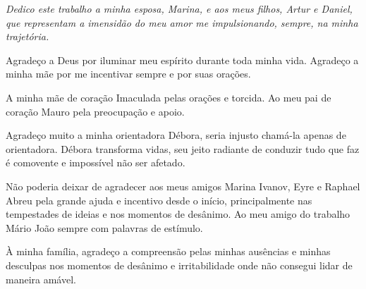 \begin{flushright}
{\em 
Dedico este trabalho a minha esposa, Marina, e aos meus filhos, Artur e Daniel, que representam a imensidão do meu amor me impulsionando, sempre, na minha trajetória.
}
\end{flushright}
\newpage


\hspace{5mm}

Agradeço a Deus por iluminar meu espírito durante toda minha vida. Agradeço a minha mãe por me incentivar sempre e por suas orações. 

A minha mãe de coração Imaculada pelas orações e torcida. Ao meu pai de coração Mauro pela preocupação e apoio.

Agradeço muito a minha orientadora Débora, seria injusto chamá-la apenas de orientadora. Débora transforma vidas, seu jeito radiante de conduzir tudo que faz é comovente e impossível não ser afetado.

Não poderia deixar de agradecer aos meus amigos Marina Ivanov,  Eyre e Raphael Abreu pela grande ajuda e incentivo desde o início, principalmente nas tempestades de ideias e nos momentos de desânimo. Ao meu amigo do trabalho Mário João sempre com palavras de estímulo.

À minha família, agradeço a compreensão pelas minhas ausências e minhas desculpas nos momentos de desânimo e irritabilidade onde não consegui lidar de maneira amável.


